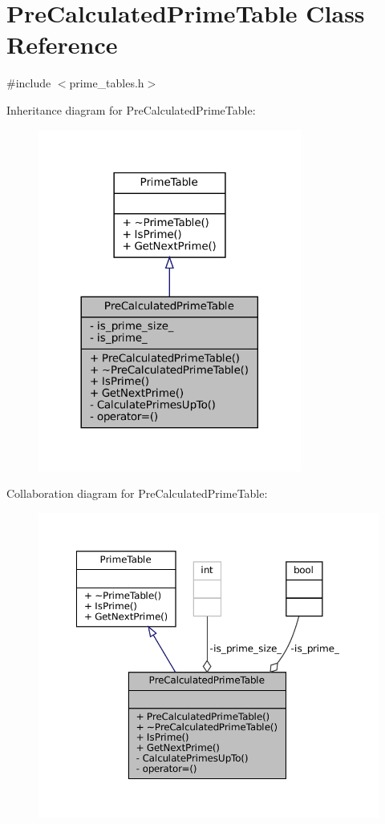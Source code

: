 \hypertarget{classPreCalculatedPrimeTable}{}\section{Pre\+Calculated\+Prime\+Table Class Reference}
\label{classPreCalculatedPrimeTable}


{\ttfamily \#include $<$prime\+\_\+tables.\+h$>$}



Inheritance diagram for Pre\+Calculated\+Prime\+Table\+:
\nopagebreak
\begin{figure}[H]
\begin{center}
\leavevmode
\includegraphics[width=245pt]{classPreCalculatedPrimeTable__inherit__graph}
\end{center}
\end{figure}


Collaboration diagram for Pre\+Calculated\+Prime\+Table\+:
\nopagebreak
\begin{figure}[H]
\begin{center}
\leavevmode
\includegraphics[width=350pt]{classPreCalculatedPrimeTable__coll__graph}
\end{center}
\end{figure}
